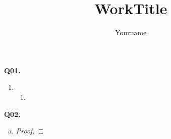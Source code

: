 \documentclass[11pt]{article}
\author{Yourname}
\title{WorkTitle}
\begin{document}
\setlength{\abovedisplayskip}{5pt}
\setlength{\belowdisplayskip}{5pt}
\parindent=0pt
\thispagestyle{firstpage}

\inserthead

\textbf{Q01.}

\begin{enumerate}
    \item 
        \begin{enumerate}
            \item 
        \end{enumerate}
\end{enumerate}

\newpage

\textbf{Q02.}

\begin{enumerate}[(a)]
    \item 
        \begin{proof}
            \begin{pcase}
                \item 
            \end{pcase}
        \end{proof}
\end{enumerate}
\end{document}
